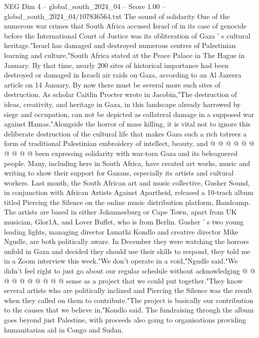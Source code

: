 \begin{textsample}{NEG Dim 4 – global\_south\_2024\_04 – Score 1.00 – global\_south\_2024\_04/107836564.txt}  \label{ex:f4_neg_196}
The sound of solidarity One of the numerous war crimes that South Africa accused Israel of in its case of genocide before the International Court of Justice was its obliteration of Gaza ' s cultural heritage."Israel has damaged and destroyed numerous centres of Palestinian learning and culture,"South Africa stated at the Peace Palace in The Hague in January.
By that time, nearly 200 sites of historical importance had been destroyed or damaged in Israeli air raids on Gaza, according to an Al Jazeera article on 14 January.
By now there must be several more such sites of destruction.
As scholar Caitlin Procter wrote in Jacobin,"The destruction of ideas, creativity, and heritage in Gaza, in this landscape already harrowed by siege and occupation, can not be depicted as collateral damage in a supposed war against Hamas."Alongside the horror of mass killing, it is vital not to ignore this deliberate destruction of the cultural life that makes Gaza such a rich tatreez a form of traditional Palestinian embroidery of intellect, beauty, and @ @ @ @ @ @ @ @ @ @ been expressing solidarity with war-torn Gaza and its beleaguered people.
Many, including here in South Africa, have created art works, music and writing to show their support for Gazans, especially its artists and cultural workers.
Last month, the South African art and music collective, Gusher Sound, in conjunction with African Artists Against Apartheid, released a 10-track album titled Piercing the Silence on the online music distribution platform, Bandcamp.
The artists are based in either Johannesburg or Cape Town, apart from UK musician, Glor1A, and Lover Buffet, who is from Berlin.
Gusher ' s two young leading lights, managing director Lunathi Kondlo and creative director Mike Ngudle, are both politically aware.
In December they were watching the horrors unfold in Gaza and decided they should use their skills to respond, they told me in a Zoom interview this week."We don't operate in a void,"Ngudle said."We didn't feel right to just go about our regular schedule without acknowledging @ @ @ @ @ @ @ @ @ @ sense as a project that we could put together."They know several artists who are politically inclined and Piercing the Silence was the result when they called on them to contribute."The project is basically our contribution to the causes that we believe in,"Kondlo said.
The fundraising through the album goes beyond just Palestine, with proceeds also going to organisations providing humanitarian aid in Congo and Sudan.

\end{textsample}
